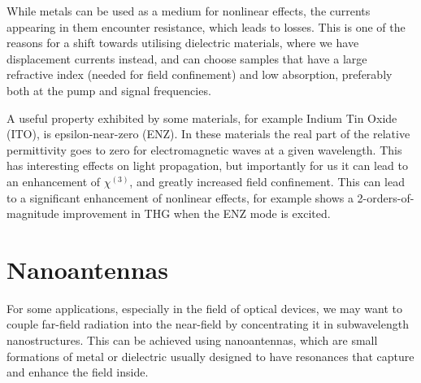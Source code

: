 \documentclass[12pt,a4paper]{article}
\begin{document}
While metals can be used as a medium for nonlinear effects, the currents appearing in them encounter resistance, which leads to losses. This is one of the reasons for a shift towards  utilising dielectric materials, where we have displacement currents instead\cite{krasnokAlldielectricOpticalNanoantennas2012,vandegroepDesigningDielectricResonators2013}, and can choose samples that have a large refractive index (needed for field confinement) and low absorption, preferably both at the pump and signal frequencies.

A useful property exhibited by some materials, for example Indium Tin Oxide (ITO), is epsilon-near-zero (ENZ). In these materials the real part of the relative permittivity goes to zero for electromagnetic waves at a given wavelength. This has interesting effects on light propagation, but importantly for us it can lead to an enhancement of $\chi^{(3)}$, and greatly increased field confinement\cite{reshefNonlinearOpticalEffects2019}. This can lead to a significant enhancement of nonlinear effects, for example \cite{lukEnhancedThirdHarmonic2015a} shows a 2-orders-of-magnitude improvement in THG when the ENZ mode is excited.

\section{Nanoantennas}
For some applications, especially in the field of optical devices,
we may want to couple far-field radiation into the near-field by concentrating it in subwavelength nanostructures. This can be achieved using nanoantennas, which are small formations of metal or dielectric usually designed to have resonances that capture and enhance the field inside\cite{krasnokAlldielectricOpticalNanoantennas2012}.
\end{document}
